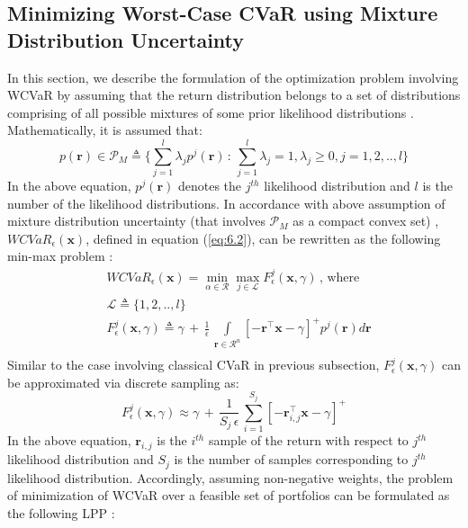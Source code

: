 \subsection {Minimizing Worst-Case CVaR using Mixture Distribution Uncertainty}
In this section, we describe the formulation of the optimization problem involving WCVaR by assuming that the return distribution belongs to a set of distributions comprising of all possible mixtures of some prior likelihood distributions \cite{zhu}. Mathematically, it is assumed that:
\begin{equation}
\label{eq:6.8}
p(\mathbf{r}) \in \mathcal{P}_{M} \triangleq \bigg\{ \sum_{j=1}^{l} \lambda_{j}p^{j}(\mathbf{r}) \, : \, \sum_{j=1}^{l}\lambda_{j}=1, \lambda_{j} \geq 0,j=1,2,..,l \bigg\}
\end{equation}
In the above equation, $p^{j}(\mathbf{r})$ denotes the $j^{th}$ likelihood distribution and $l$ is the number of the likelihood distributions. In accordance with above assumption of mixture distribution uncertainty (that involves $\mathcal{P}_{M}$ as a compact convex set) , $WCVaR_{\epsilon}(\mathbf{x})$, defined in equation (\ref{eq:6.2}), can be rewritten as the following min-max problem \cite{zhu}: 
\begin{equation}
\label{eq:6.9}
\begin{split}
& WCVaR_{\epsilon}(\mathbf{x}) = \min_{\alpha \in \mathcal{R}} \max_{j \in \mathcal{L} } F_{\epsilon}^{j}(\mathbf{x},\gamma) \, , \, \text{where} \\
& \mathcal{L} \triangleq \{ 1,2,..,l \} \\
& F_{\epsilon}^{j}(\mathbf{x},\gamma) \triangleq \gamma \, + \, \frac{1}{\epsilon} \, \int \limits_{\mathbf{r} \in \mathcal{R}^{n}} [-\mathbf{r}^{\top}\mathbf{x}-\gamma]^{+} p^{j}(\mathbf{r})  d\mathbf{r} \\
\end{split}
\end{equation}
Similar to the case involving classical CVaR in previous subsection, $F_{\epsilon}^{j}(\mathbf{x},\gamma)$ can be approximated via discrete sampling as:
\begin{equation}
\label{eq:6.10}
F_{\epsilon}^{j}(\mathbf{x},\gamma) \approx \gamma \, + \, \frac{1}{S_{j} \, \epsilon} \, \sum_{i=1}^{S_{j}} [-\mathbf{r}_{i,j}^{\top}\mathbf{x}-\gamma]^{+}
\end{equation}
In the above equation, $\mathbf{r}_{i,j}$ is the $i^{th}$ sample of the return with respect to $j^{th}$ likelihood distribution and $S_{j}$ is the number of samples corresponding to $j^{th}$ likelihood distribution. Accordingly, assuming non-negative weights, the problem of minimization of WCVaR over a feasible set of portfolios can be formulated as the following LPP \cite{zhu}:
